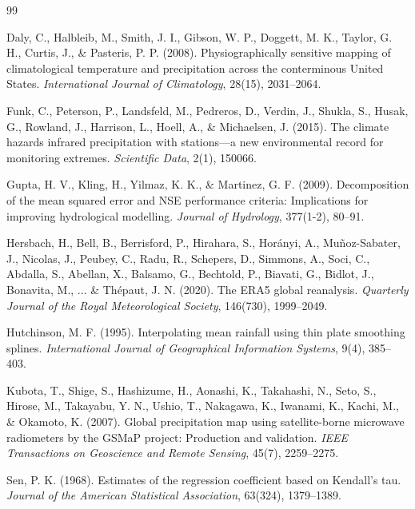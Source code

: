 \documentclass[11pt,a4paper,titlepage]{article}
\begin{document}
\newpage
\begin{thebibliography}{99}

Daly, C., Halbleib, M., Smith, J. I., Gibson, W. P., Doggett, M. K., Taylor, G. H., Curtis, J., \& Pasteris, P. P. (2008). Physiographically sensitive mapping of climatological temperature and precipitation across the conterminous United States. \textit{International Journal of Climatology}, 28(15), 2031--2064.

Funk, C., Peterson, P., Landsfeld, M., Pedreros, D., Verdin, J., Shukla, S., Husak, G., Rowland, J., Harrison, L., Hoell, A., \& Michaelsen, J. (2015). The climate hazards infrared precipitation with stations—a new environmental record for monitoring extremes. \textit{Scientific Data}, 2(1), 150066.

Gupta, H. V., Kling, H., Yilmaz, K. K., \& Martinez, G. F. (2009). Decomposition of the mean squared error and NSE performance criteria: Implications for improving hydrological modelling. \textit{Journal of Hydrology}, 377(1-2), 80--91.

Hersbach, H., Bell, B., Berrisford, P., Hirahara, S., Horányi, A., Muñoz-Sabater, J., Nicolas, J., Peubey, C., Radu, R., Schepers, D., Simmons, A., Soci, C., Abdalla, S., Abellan, X., Balsamo, G., Bechtold, P., Biavati, G., Bidlot, J., Bonavita, M., ... \& Thépaut, J. N. (2020). The ERA5 global reanalysis. \textit{Quarterly Journal of the Royal Meteorological Society}, 146(730), 1999--2049.

Hutchinson, M. F. (1995). Interpolating mean rainfall using thin plate smoothing splines. \textit{International Journal of Geographical Information Systems}, 9(4), 385--403.

Kubota, T., Shige, S., Hashizume, H., Aonashi, K., Takahashi, N., Seto, S., Hirose, M., Takayabu, Y. N., Ushio, T., Nakagawa, K., Iwanami, K., Kachi, M., \& Okamoto, K. (2007). Global precipitation map using satellite-borne microwave radiometers by the GSMaP project: Production and validation. \textit{IEEE Transactions on Geoscience and Remote Sensing}, 45(7), 2259--2275.

Sen, P. K. (1968). Estimates of the regression coefficient based on Kendall's tau. \textit{Journal of the American Statistical Association}, 63(324), 1379--1389.


\end{thebibliography}
\end{document}
